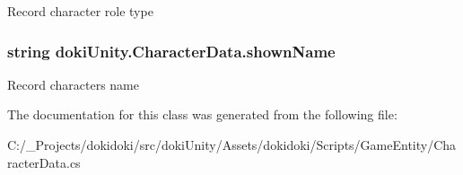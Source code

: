 Record character role type 

\subsubsection[{\texorpdfstring{shown\+Name}{shownName}}]{\setlength{\rightskip}{0pt plus 5cm}string doki\+Unity.\+Character\+Data.\+shown\+Name}\hypertarget{classdoki_unity_1_1_character_data_abbf9ffe3b7f78d95979048a0de3c379a}{}\label{classdoki_unity_1_1_character_data_abbf9ffe3b7f78d95979048a0de3c379a}


Record character\textquotesingle{}s name 



The documentation for this class was generated from the following file\+:\begin{DoxyCompactItemize}
\item 
C\+:/\+\_\+\+Projects/dokidoki/src/doki\+Unity/\+Assets/dokidoki/\+Scripts/\+Game\+Entity/Character\+Data.\+cs\end{DoxyCompactItemize}
